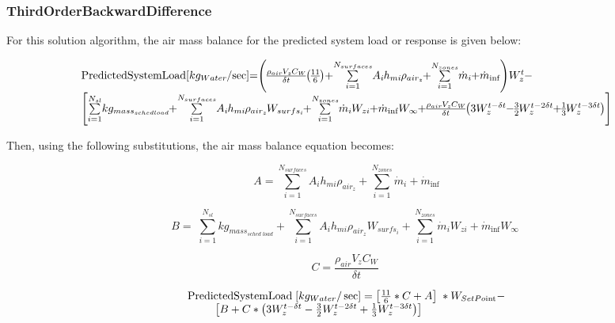 \subsubsection{ThirdOrderBackwardDifference}\label{thirdorderbackwarddifference-001}

For this solution algorithm, the air mass balance for the predicted system load or response is given below:

\begin{equation}
\medmuskip=0mu
\thinmuskip=0mu
\thickmuskip=0mu
\nulldelimiterspace=0pt
\scriptspace=0pt
\begin{array}{l}{\rm{PredictedSystemLoad}}\;[k{g_{Water}}/\sec ] = \left( {\frac{{{\rho_{air}}{V_z}{C_W}}}{{\delta t}}\left( {\frac{{11}}{6}} \right) + \sum\limits_{i = 1}^{{N_{surfaces}}} {{A_i}{h_{mi}}} {\rho_{ai{r_z}}} + \sum\limits_{i = 1}^{{N_{zones}}} {{{\dot m}_i}}  + {{\dot m}_{\inf }}} \right)W_z^t - \\\;\;\;\left[ {\sum\limits_{i = 1}^{{N_{sl}}} {k{g_{mas{s_{sched\;load}}}}}  + \sum\limits_{i = 1}^{{N_{surfaces}}} {{A_i}{h_{mi}}} {\rho_{ai{r_z}}}{W_{surf{s_i}}} + \sum\limits_{i = 1}^{{N_{zones}}} {{{\dot m}_i}} {W_{zi}} + {{\dot m}_{\inf }}{W_\infty } + \frac{{{\rho_{air}}{V_z}{C_W}}}{{\delta t}}\left( {3W_z^{t - \delta t} - \frac{3}{2}W_z^{t - 2\delta t} + \frac{1}{3}W_z^{t - 3\delta t}} \right)} \right]\;\;\end{array}
\end{equation}

Then, using the following substitutions, the air mass balance equation becomes:

\begin{equation}
A = \sum\limits_{i = 1}^{{N_{surfaces}}} {{A_i}{h_{mi}}} {\rho_{ai{r_z}}} + \sum\limits_{i = 1}^{{N_{zones}}} {{{\dot m}_i}}  + {\dot m_{\inf }}
\end{equation}

\begin{equation}
B = \;\sum\limits_{i = 1}^{{N_{sl}}} {k{g_{mas{s_{sched\;load}}}}}  + \sum\limits_{i = 1}^{{N_{surfaces}}} {{A_i}{h_{mi}}} {\rho_{ai{r_z}}}{W_{surf{s_i}}} + \sum\limits_{i = 1}^{{N_{zones}}} {{{\dot m}_i}} {W_{zi}} + {\dot m_{\inf }}{W_\infty }\;
\end{equation}

\begin{equation}
C = \frac{{{\rho_{air}}{V_z}{C_W}}}{{\delta t}}\;
\end{equation}

\begin{equation}
\begin{array}{l}{\rm{PredictedSystemLoad}}\;[k{g_{Water}}/\sec ] = \left[ {\frac{{11}}{6}*C + A} \right]\;*{W_{SetPo{\mathop{\rm int}} }} - \\\;\;\;\;\;\;\;\;\;\left[ {B + C*\left( {3W_z^{t - \delta t} - \frac{3}{2}W_z^{t - 2\delta t} + \frac{1}{3}W_z^{t - 3\delta t}} \right)} \right]\end{array}
\end{equation}

